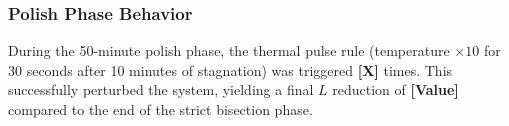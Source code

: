 
\subsubsection{Polish Phase Behavior}
During the 50-minute polish phase, the thermal pulse rule (temperature $\times 10$ for 30 seconds after 10 minutes of stagnation) was triggered \textbf{[X]} times. This successfully perturbed the system, yielding a final $L$ reduction of \textbf{[Value]} compared to the end of the strict bisection phase.
